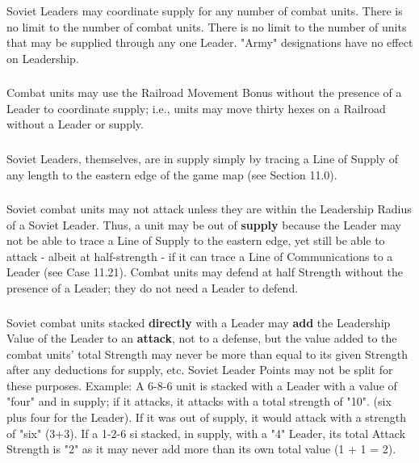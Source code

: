 \subsubsection{} Soviet Leaders may coordinate supply for any number of combat units. There is no limit to the number of combat units. There is no limit to the number of units that may be supplied through any one Leader. "Army" designations have no effect on Leadership.

\subsubsection{} Combat units may use the Railroad Movement Bonus without the presence of a Leader to coordinate supply; i.e., units may move thirty hexes on a Railroad without a Leader or supply.

\subsubsection{} Soviet Leaders, themselves, are in supply simply by tracing a Line of Supply of any length to the eastern edge of the game map (see Section 11.0).

\subsubsection{} Soviet combat units may not attack unless they are within the Leadership Radius of a Soviet Leader. Thus, a unit may be out of \textbf{supply} because the Leader may not be able to trace a Line of Supply to the eastern edge, yet still be able to attack - albeit at half-strength - if it can trace a Line of Communications to a Leader (see Case 11.21). Combat units may defend at half Strength without the presence of a Leader; they do not need a Leader to defend.

\subsubsection{} Soviet combat units stacked \textbf{directly} with a Leader may \textbf{add} the Leadership Value of the Leader to an \textbf{attack}, not to a defense, but the value added to the combat units' total Strength may never be more than equal to its given Strength after any deductions for supply, etc. Soviet Leader Points may not be split for these purposes. Example: A 6-8-6 unit is stacked with a Leader with a value of "four" and in supply; if it attacks, it attacks with a total strength of "10". (six plus four for the Leader). If it was out of supply, it would attack with a strength of "six" (3+3). If a 1-2-6 si stacked, in supply, with a "4" Leader, its total Attack Strength is "2" as it may never add more than its own total value (1 + 1 = 2).



